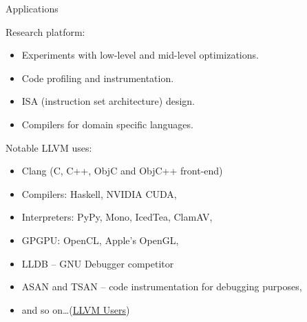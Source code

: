 \documentclass[8pt]{beamer}
\begin{document}
\begin{frame}[fragile]{Applications}
  \begin{block}{Research platform:}
    \begin{itemize}
      \item Experiments with low-level and mid-level optimizations.
      \item Code profiling and instrumentation.
      \item ISA (instruction set architecture) design.
      \item Compilers for domain specific languages.
    \end{itemize}
  \end{block}

  \begin{exampleblock}{Notable LLVM uses:}
    \begin{itemize}
      \item Clang (C, C++, ObjC and ObjC++ front-end)
      \item Compilers: Haskell, NVIDIA CUDA, 
      \item Interpreters: PyPy, Mono, IcedTea, ClamAV,
      \item GPGPU: OpenCL, Apple's OpenGL,
      \item LLDB -- GNU Debugger competitor
      \item ASAN and TSAN -- code instrumentation for debugging purposes,
      \item and so on\ldots (\href{http://llvm.org/Users.html}{LLVM Users})
    \end{itemize}
  \end{exampleblock}
\end{frame}
\end{document}
